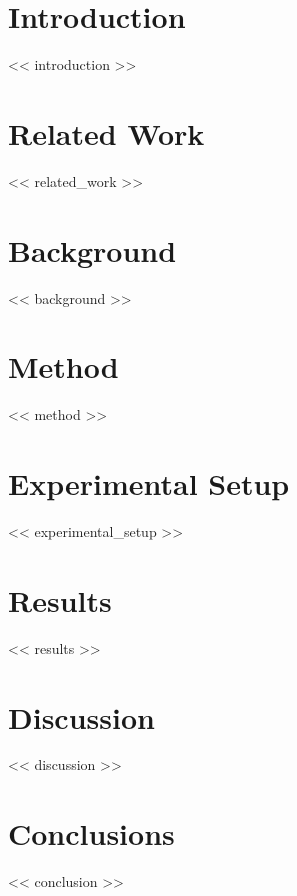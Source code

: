 \documentclass[journal,article,submit,pdftex,moreauthors]{Definitions/mdpi}
\begin{document}
\section{Introduction}

<< introduction >>

\section{Related Work}

<< related\_work >>

\section{Background}

<< background >>

\section{Method}

<< method >>

\section{Experimental Setup}

<< experimental\_setup >>

\section{Results}

<< results >>

\section{Discussion}

<< discussion >>

\section{Conclusions}

<< conclusion >>

\vspace{6pt}
\end{document}
